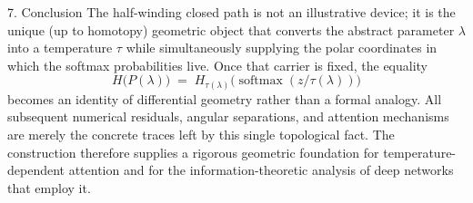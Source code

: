 7. Conclusion
The half-winding closed path is not an illustrative device; it is the unique (up to homotopy) geometric object that converts the abstract parameter \(\lambda\) into a temperature \(\tau\) while simultaneously supplying the polar coordinates in which the softmax probabilities live. Once that carrier is fixed, the equality
\[
H\bigl(P(\lambda)\bigr)\;=\;H_{\tau(\lambda)}\bigl(\operatorname{softmax}(z/\tau(\lambda))\bigr)
\]
becomes an identity of differential geometry rather than a formal analogy. All subsequent numerical residuals, angular separations, and attention mechanisms are merely the concrete traces left by this single topological fact.
The construction therefore supplies a rigorous geometric foundation for temperature-dependent attention and for the information-theoretic analysis of deep networks that employ it.
